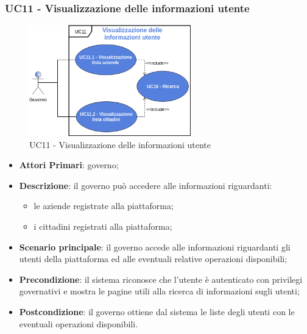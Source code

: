  \subsubsection{UC11 - Visualizzazione delle informazioni utente}
 \begin{figure}[h]
 	\includegraphics[width=7cm]{res/images/UC11-Generale.png}
 	\centering
 	\caption{UC11 - Visualizzazione delle informazioni utente}
 	
 \end{figure}
 \begin{itemize}
 	\item \textbf{Attori Primari}: governo;
 	\item \textbf{Descrizione}: il governo può accedere alle informazioni riguardanti:
 	\begin{itemize}
 		\item le aziende registrate alla piattaforma;
 		\item i cittadini registrati alla piattaforma;

 	\end{itemize}
 	\item \textbf{Scenario principale}: il governo accede alle informazioni riguardanti gli utenti della piattaforma ed alle eventuali relative operazioni disponibili;

 	\item \textbf{Precondizione}: il sistema riconosce che l'utente è autenticato con privilegi governativi e mostra le pagine utili alla ricerca di informazioni sugli utenti;
 	
 	\item \textbf{Postcondizione}: il governo ottiene dal sistema le liste degli utenti con le eventuali operazioni disponibili.
 \end{itemize}

